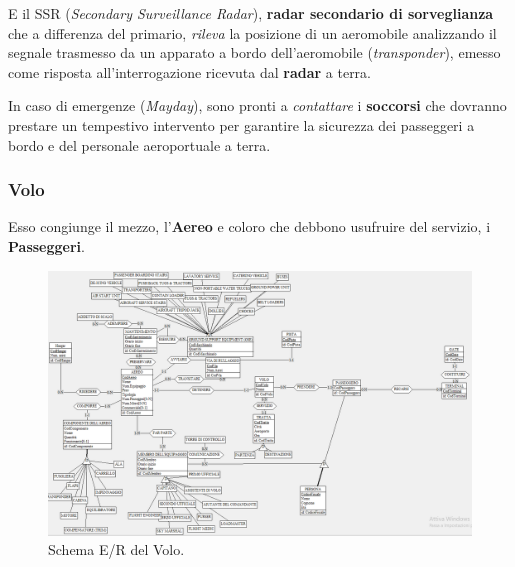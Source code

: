 \textsf{\small E il SSR (\emph{Secondary Surveillance Radar}), \textbf{radar secondario di sorveglianza} che a differenza del primario, \emph{rileva} la posizione di un aeromobile analizzando il segnale trasmesso da un apparato a bordo dell'aeromobile (\emph{transponder}), emesso come risposta all'interrogazione ricevuta dal \textbf{radar} a terra.}\break

\textsf{\small In caso di emergenze (\emph{Mayday}), sono pronti a \emph{contattare} i \textbf{soccorsi} che dovranno prestare un tempestivo intervento per garantire la sicurezza dei passeggeri a bordo e del personale aeroportuale a terra. }\\


\newpage

\subsubsection{Volo}


\textsf{\small Esso congiunge il mezzo, l'\textbf{Aereo} e coloro che debbono usufruire del servizio, i \textbf{Passeggeri}.}\\

\begin{figure}[H] %
	\centering
	\includegraphics[width=1.2\linewidth, height=1.2\textheight, keepaspectratio]{./img/Volo.png}
	\caption{Schema E/R del Volo.}
	\label{fig:schema_volo}
\end{figure}

